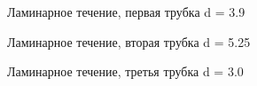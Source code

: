 \documentclass[a4paper,12pt]{article}
\begin{document}
    \begin{figure}[h!]
    \caption[]{ Ламинарное течение, первая трубка d = 3.9 }
    \end{figure}

    \begin{figure}[h!]
    \caption[]{ Ламинарное течение, вторая трубка d = 5.25 }
    \end{figure}

    \begin{figure}[h!]
    \caption[]{ Ламинарное течение, третья трубка d = 3.0 }
    \end{figure}
\end{document}
